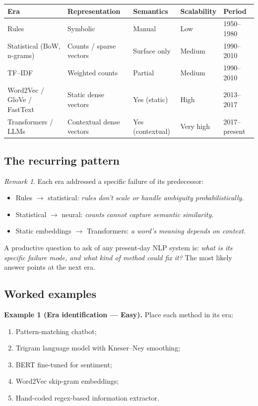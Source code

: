 \documentclass[12pt,a4paper]{report}
\theoremstyle{definition}
\theoremstyle{remark}
\newtheorem{remark}{Remark}[section]
\begin{document}
\begin{center}
\begin{tabular}{|l|l|l|l|l|}
\hline
\textbf{Era} & \textbf{Representation} & \textbf{Semantics} & \textbf{Scalability} & \textbf{Period} \\
\hline
Rules & Symbolic & Manual & Low & 1950--1980 \\
Statistical (BoW, n-grams) & Counts / sparse vectors & Surface only & Medium & 1990--2010 \\
TF--IDF & Weighted counts & Partial & Medium & 1990--2010 \\
Word2Vec / GloVe / FastText & Static dense vectors & Yes (static) & High & 2013--2017 \\
Transformers / LLMs & Contextual dense vectors & Yes (contextual) & Very high & 2017--present \\
\hline
\end{tabular}
\end{center}

\subsection{The recurring pattern}

\begin{remark}
Each era addressed a specific failure of its predecessor:
\begin{itemize}
    \item Rules $\to$ statistical: \emph{rules don't scale or handle ambiguity probabilistically.}
    \item Statistical $\to$ neural: \emph{counts cannot capture semantic similarity.}
    \item Static embeddings $\to$ Transformers: \emph{a word's meaning depends on context.}
\end{itemize}
A productive question to ask of any present-day NLP system is: \emph{what is its specific failure mode, and what kind of method could fix it?} The most likely answer points at the next era.
\end{remark}

\subsection{Worked examples}

\textbf{Example 1 (Era identification --- Easy).}
Place each method in its era:
\begin{enumerate}
    \item Pattern-matching chatbot;
    \item Trigram language model with Kneser--Ney smoothing;
    \item BERT fine-tuned for sentiment;
    \item Word2Vec skip-gram embeddings;
    \item Hand-coded regex-based information extractor.
\end{enumerate}
\end{document}

